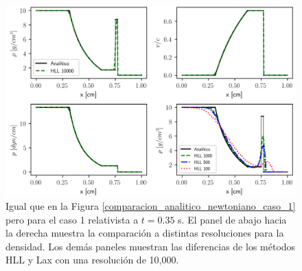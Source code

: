 \documentclass[12pt,a4paper]{book}
\begin{document}
\begin{figure}
  \centering
    \includegraphics[width=1.0\textwidth]{./Figuras/verificacion_del_codigo/caso_relativista/caso_rel_rar_shock.png}
  \caption{Igual que en la Figura \ref{comparacion_analitico_newtoniano_caso_1} pero para el caso 1 
  relativista 
  a $t = 0.35$ s. El panel de abajo 
  hacia la
  derecha muestra la comparación a distintas resoluciones para la densidad. Los demás paneles muestran
  las diferencias de los métodos HLL y Lax con una resolución de 10,000.}\label{caso_rel_rar_shock}
\end{figure}

\end{document}
